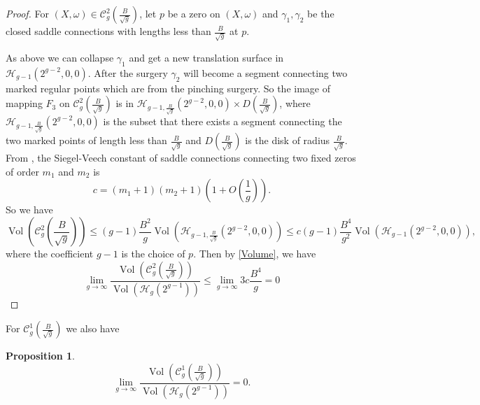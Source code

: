 \documentclass[12pt]{amsart} %
\newtheorem{proposition}[theorem]{Proposition}
\theoremstyle{definition}
\theoremstyle{remark}
\numberwithin{equation}{section}
\renewcommand\H{{\mathcal H}}
\newcommand{\V}{\operatorname{Vol}}
\begin{document}
\begin{proof}
For $(X,\omega) \in \mathcal{C}_g^{2}(\frac{B}{\sqrt{g}})$, 
let $p$ be a zero on $(X,\omega)$ and $\gamma_1, \gamma_2$ be the closed saddle connections with lengths less than $\frac{B}{\sqrt{g}}$ at $p$.

As above we can collapse $\gamma_1$ and get a new translation surface in $\H_{g-1}(2^{g-2},0,0)$. 
After the surgery $\gamma_2$ will become a segment connecting two marked regular points which are from the pinching surgery.
So the image of mapping $F_3$ on $\mathcal{C}_g^{2}(\frac{B}{\sqrt{g}})$ is in 
$\H_{g-1,\frac{B}{\sqrt{g}}}(2^{g-2},0,0)\times D(\frac{B}{\sqrt{g}})$, 
where $\H_{g-1,\frac{B}{\sqrt{g}}}(2^{g-2},0,0)$ is the subset that there exists a segment connecting the two marked points of length less than 
$\frac{B}{\sqrt{g}}$ and $D(\frac{B}{\sqrt{g}})$ is the disk of radius $\frac{B}{\sqrt{g}}$.
From \cite[Theorem 1.2]{aggarwal2019large}, the Siegel-Veech constant of saddle connections connecting two fixed zeros of order $m_1$ and $m_2$ is
$$c=(m_1+1)(m_2+1)(1+O(\frac{1}{g})).$$
So we have
$$\V(\mathcal{C}_g^{2}(\frac{B}{\sqrt{g}}))\leq (g-1)\frac{B^2}{g}\V(\H_{g-1,\frac{B}{\sqrt{g}}}(2^{g-2},0,0)) \leq c(g-1)\frac{B^4}{g^2}\V(\H_{g-1}(2^{g-2},0,0)),$$
where the coefficient $g-1$ is the choice of $p$.
Then by \ref{Volume}, we have
$$\lim_{g\to \infty}\frac{\V(\mathcal{C}_g^{2}(\frac{B}{\sqrt{g}}))}{\V(\H_g(2^{g-1}))}\leq \lim_{g\to \infty}3c\frac{B^4}{g}=0$$
\end{proof}


For $\mathcal{C}_g^{1}(\frac{B}{\sqrt{g}})$ we also have
\begin{proposition}\label{intersect}
$$\lim_{g\to \infty}\frac{\V(\mathcal{C}_g^{1}(\frac{B}{\sqrt{g}}))}{\V(\H_g(2^{g-1}))} = 0.$$
\end{proposition}
\end{document}

